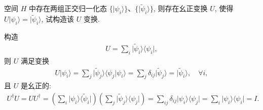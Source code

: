 \documentclass{assignment}
\begin{document}
\begin{prob}
    空间 $H$ 中存在两组正交归一化态 $\{\lvert\psi_i\rangle\}$、$\{\lvert\tilde{\psi}_i\rangle\}$, 则存在幺正变换 $U$, 使得 $U\lvert\psi_i\rangle=\lvert\tilde{\psi}_i\rangle$, 试构造该 $U$ 变换.
\end{prob}
\begin{sol}
    构造
    \begin{align}
        U=\sum_i\lvert\tilde{\psi}_i\rangle\langle\psi_i\rvert,
    \end{align}
    则 $U$ 满足变换
    \begin{align}
        U\lvert\psi_i\rangle=\sum_j\lvert\tilde{\psi}_j\rangle\langle\psi_j\vert\psi_i\rangle=\sum_j\delta_{ij}\lvert\tilde{\psi}_j\rangle=\lvert\tilde{\psi}_i\rangle,\quad\forall i,
    \end{align}
    且 $U$ 是幺正的:
    \begin{align}
        U^{\dagger}U=UU^{\dagger}=\left(\sum_i\lvert\psi_i\rangle\langle\tilde{\psi}_i\rvert\right)\left(\sum_j\lvert\tilde{\psi}_j\rangle\langle\psi_j\rvert\right)=\sum_{ij}\delta_{ij}\lvert\psi_i\rangle\langle\psi_j\rvert=\sum_i\lvert\psi_i\rangle\langle\psi_i\rvert=I.
    \end{align}
\end{sol}
\end{document}
